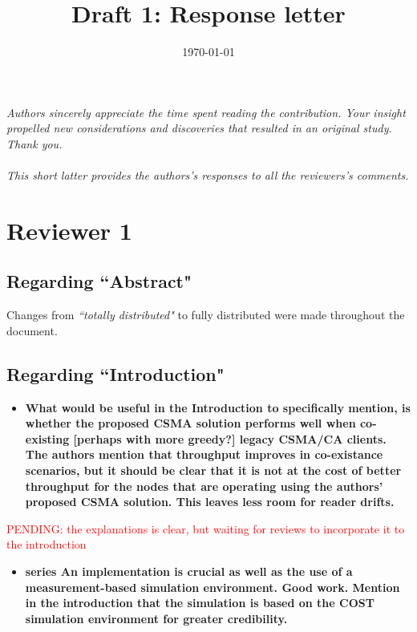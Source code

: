 \documentclass[]{article}
\begin{document}
\title{Draft 1: Response letter}
  \author{
      }

\date{\today}
\maketitle
\emph{Authors sincerely appreciate the time spent reading the contribution. Your insight propelled new considerations and discoveries that resulted in an original study. Thank you. \\\\This short latter provides the authors's responses to all the reviewers's comments.}

\section{Reviewer 1}
	\subsection{Regarding ``Abstract"}
		Changes from \emph{``totally distributed"} to fully distributed were made throughout the document.
	
	\subsection{Regarding ``Introduction"}
		\begin{itemize}
			\item {\bfseries What would be useful in the Introduction to specifically mention, is whether the proposed CSMA solution performs well when co-existing [perhaps with more greedy?] legacy CSMA/CA clients. The authors mention that throughput improves in co-existance scenarios, but it should be clear that it is not at the cost of better throughput for the nodes that are operating using the authors' proposed CSMA solution. This leaves less room for reader drifts.}
		\end{itemize}
		
		\textcolor{red}{PENDING: the explanations is clear, but waiting for reviews to incorporate it to the introduction}
		
		\begin{itemize}
			\item {\bf series An implementation is crucial as well as the use of a measurement-based simulation environment. Good work. Mention in the introduction that the simulation is based on the COST simulation environment for greater credibility.}
		\end{itemize}
		
\end{document}
